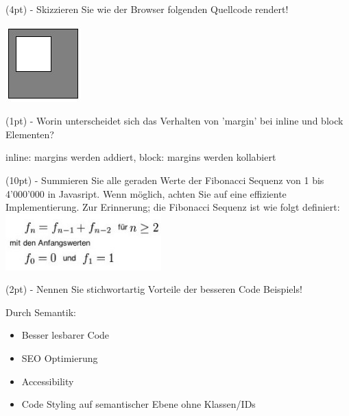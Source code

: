 \documentclass[10pt,ngerman]{examdesign}
\begin{document}
\begin{shortanswer}

  \begin{question}
    (4pt) - Skizzieren Sie wie der Browser folgenden Quellcode rendert!
    \begin{answer}
      \includegraphics{margins.jpg}
    \end{answer}
  \end{question}

  \begin{question}
    (1pt) - Worin unterscheidet sich das Verhalten von 'margin' bei inline und block
    Elementen?
    \begin{answer}
    inline: margins werden addiert,
    block: margins werden kollabiert
    \end{answer}
  \end{question}

  \begin{question}
    (10pt) - Summieren Sie alle geraden Werte der Fibonacci Sequenz von 1 bis 4'000'000
     in Javasript. Wenn m\"oglich, achten Sie auf eine effiziente
     Implementierung. Zur Erinnerung; die Fibonacci Sequenz ist wie folgt
    definiert:\\
    \includegraphics[width=60mm]{fibonacci.jpg}
    \begin{answer}
    \end{answer}
  \end{question}

  \begin{question}
    (2pt) - Nennen Sie stichwortartig Vorteile der besseren Code Beispiels!
    \begin{answer}
      Durch Semantik:
      \begin{itemize}
        \item Besser lesbarer Code
        \item SEO Optimierung
        \item Accessibility
        \item Code Styling auf semantischer Ebene ohne Klassen/IDs
      \end{itemize}
    \end{answer}
  \end{question}


\end{shortanswer}
\end{document}
